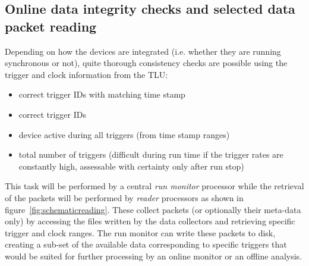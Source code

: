 \documentclass[paper=a4, fontsize=11pt, titlepage]{scrartcl}	%
\numberwithin{equation}{section}		%
\numberwithin{figure}{section}			%
\numberwithin{table}{section}           	%
\begin{document}
\subsection{Online data integrity checks and selected data packet reading}
\label{sec:integrity}
Depending on how the devices are integrated (i.e. whether they are running
synchronous or not), quite thorough consistency checks are
possible using the trigger and clock information from the TLU:

\begin{itemize}
\item correct trigger IDs with matching time stamp
\item correct trigger IDs
\item device active during all triggers (from time stamp ranges)
\item total number of triggers (difficult during run time if the trigger
  rates are constantly high, assessable with certainty only after run stop)
\end{itemize}

This task will be performed by a central \emph{run monitor} processor
while the retrieval of the packets will be performed by \emph{reader}
processors as shown in figure~\ref{fig:schematicreading}. These
collect packets (or optionally their meta-data only) by accessing the
files written by the data collectors and retrieving specific trigger
and clock ranges. The run monitor can write these packets to disk,
creating a sub-set of the available data corresponding to specific
triggers that would be suited for further processing by an online
monitor or an offline analysis. 
\end{document}
